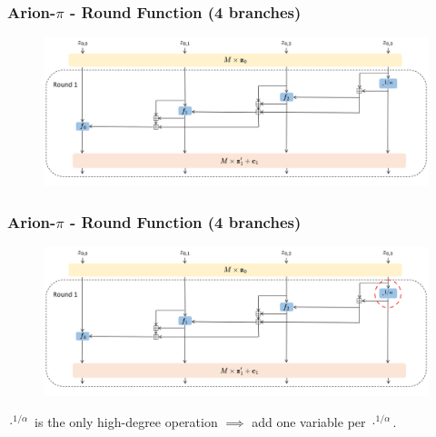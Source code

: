 \documentclass[aspectratio=169]{beamer}
\begin{document}


%     


\begin{frame}
  \frametitle{Arion-$\pi$ - Round Function (4 branches)}
  \begin{figure}
    \centering
    \includegraphics[width=\textwidth]{./figures/arion-round.png}
  \end{figure}

  \vspace{25pt}
  \end{frame}

\begin{frame}
  \frametitle{Arion-$\pi$ - Round Function (4 branches)}
  \begin{figure}
    \centering
    \includegraphics[width=\textwidth]{./figures/arion-round-inv.png}
  \end{figure}

  \begin{center}
    \textcolor{myred}{$\cdot^{1/\alpha}$ is the only high-degree operation} $\implies$ add one variable per $\cdot^{1/\alpha}$. 
  \end{center}
\end{frame}
\end{document}
